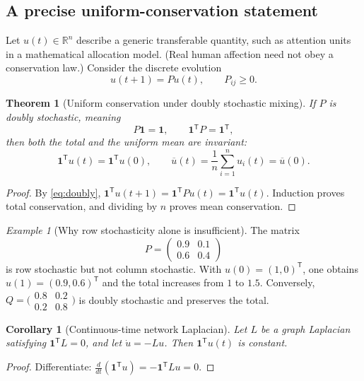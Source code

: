 \documentclass[11pt,a4paper]{article}
\numberwithin{equation}{section}
\newtheorem{theorem}[definition]{Theorem}
\newtheorem{corollary}[definition]{Corollary}
\theoremstyle{remark}
\newtheorem{example}[definition]{Example}
\newcommand{\R}{\mathbb{R}}
\newcommand{\1}{\mathbf{1}}
\begin{document}
\subsection{A precise uniform-conservation statement}
Let $u(t)\in\R^n$ describe a generic transferable quantity, such as
attention units in a mathematical allocation model.  (Real human
affection need not obey a conservation law.)  Consider the discrete
evolution
\begin{equation}\label{eq:mixing}
u(t+1)=Pu(t),\qquad P_{ij}\ge0.
\end{equation}

\begin{theorem}[Uniform conservation under doubly stochastic mixing]
If $P$ is \emph{doubly stochastic}, meaning
\begin{equation}\label{eq:doubly}
P\1=\1,\qquad \1^{\mathsf T}P=\1^{\mathsf T},
\end{equation}
then both the total and the uniform mean are invariant:
\begin{equation}\label{eq:conservation}
\boxed{\1^{\mathsf T}u(t)=\1^{\mathsf T}u(0),
\qquad \overline u(t)=\frac1n\sum_{i=1}^nu_i(t)=\overline u(0).}
\end{equation}
\end{theorem}
\begin{proof}
By \eqref{eq:doubly},
$\1^{\mathsf T}u(t+1)=\1^{\mathsf T}Pu(t)=\1^{\mathsf T}u(t)$.
Induction proves total conservation, and dividing by $n$ proves
mean conservation.
\end{proof}

\begin{example}[Why row stochasticity alone is insufficient]
The matrix
\begin{equation}
P=\begin{pmatrix}0.9&0.1\\0.6&0.4\end{pmatrix}
\end{equation}
is row stochastic but not column stochastic.  With
$u(0)=(1,0)^{\mathsf T}$, one obtains
$u(1)=(0.9,0.6)^{\mathsf T}$ and the total increases from $1$
to $1.5$.  Conversely,
$Q=\bigl(\begin{smallmatrix}0.8&0.2\\0.2&0.8\end{smallmatrix}\bigr)$
is doubly stochastic and preserves the total.
\end{example}

\begin{corollary}[Continuous-time network Laplacian]
Let $L$ be a graph Laplacian satisfying
$\1^{\mathsf T}L=0$, and let
$\dot u=-Lu$.  Then $\1^{\mathsf T}u(t)$ is constant.
\end{corollary}
\begin{proof}
Differentiate:
$\frac{d}{dt}(\1^{\mathsf T}u)
=-\1^{\mathsf T}Lu=0$.
\end{proof}
\end{document}
